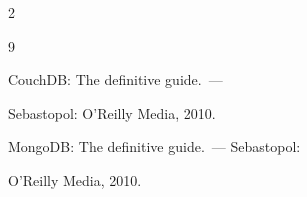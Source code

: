 \begin{multicols}{2}
{{\begin{thebibliography}{9}


 CouchDB: The definitive guide.~--- 


Sebastopol: O'Reilly Media, 2010.





\label{end\stat}










 MongoDB: The definitive guide.~--- Sebastopol: 


O'Reilly Media, 2010. 


\end{thebibliography}


} }





\end{multicols}


